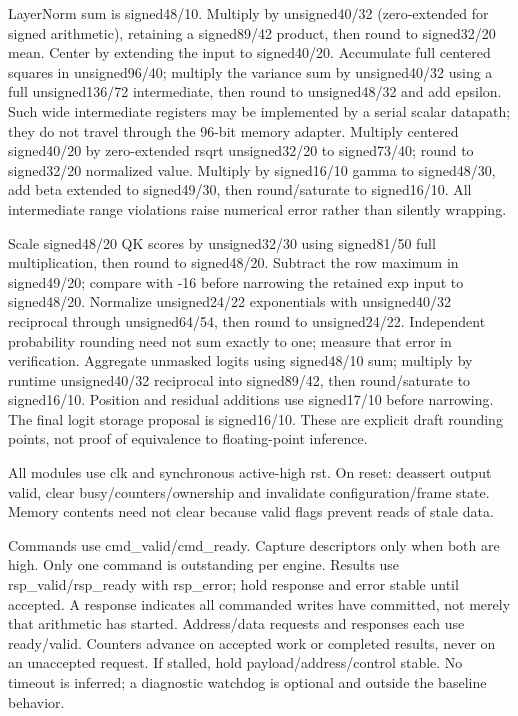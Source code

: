 \documentclass[11pt,a4paper]{article}
\begin{document}
LayerNorm sum is signed48/10. Multiply by unsigned40/32 (zero-extended for signed arithmetic), retaining a signed89/42 product, then round to signed32/20 mean. Center by extending the input to signed40/20. Accumulate full centered squares in unsigned96/40; multiply the variance sum by unsigned40/32 using a full unsigned136/72 intermediate, then round to unsigned48/32 and add epsilon. Such wide intermediate registers may be implemented by a serial scalar datapath; they do not travel through the 96-bit memory adapter. Multiply centered signed40/20 by zero-extended rsqrt unsigned32/20 to signed73/40; round to signed32/20 normalized value. Multiply by signed16/10 gamma to signed48/30, add beta extended to signed49/30, then round/saturate to signed16/10. All intermediate range violations raise numerical error rather than silently wrapping.

Scale signed48/20 QK scores by unsigned32/30 using signed81/50 full multiplication, then round to signed48/20. Subtract the row maximum in signed49/20; compare with -16 before narrowing the retained exp input to signed48/20. Normalize unsigned24/22 exponentials with unsigned40/32 reciprocal through unsigned64/54, then round to unsigned24/22. Independent probability rounding need not sum exactly to one; measure that error in verification. Aggregate unmasked logits using signed48/10 sum; multiply by runtime unsigned40/32 reciprocal into signed89/42, then round/saturate to signed16/10. Position and residual additions use signed17/10 before narrowing. The final logit storage proposal is signed16/10. These are explicit draft rounding points, not proof of equivalence to floating-point inference.

All modules use clk and synchronous active-high rst. On reset: deassert output valid, clear busy/counters/ownership and invalidate configuration/frame state. Memory contents need not clear because valid flags prevent reads of stale data.

Commands use cmd\_valid/cmd\_ready. Capture descriptors only when both are high. Only one command is outstanding per engine. Results use rsp\_valid/rsp\_ready with rsp\_error; hold response and error stable until accepted. A response indicates all commanded writes have committed, not merely that arithmetic has started. Address/data requests and responses each use ready/valid. Counters advance on accepted work or completed results, never on an unaccepted request. If stalled, hold payload/address/control stable. No timeout is inferred; a diagnostic watchdog is optional and outside the baseline behavior.
\end{document}
